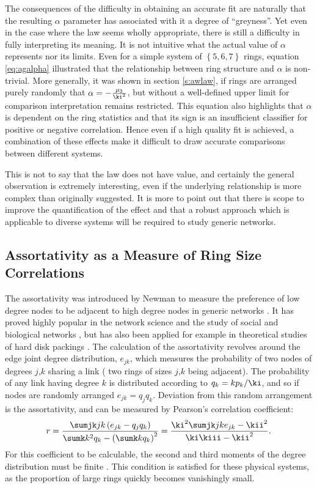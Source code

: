 The consequences of the difficulty in obtaining an accurate \aw{} fit are naturally that the resulting $\alpha$ parameter has associated with it a degree of ``greyness''.
Yet even in the case where the \aw{} law seems wholly appropriate, there is still a difficulty in fully interpreting its meaning.
It is not intuitive what the actual value of $\alpha$ represents nor its limits.
Even for a simple system of $\left\{5,6,7\right\}$ rings, equation \eqref{eq:agalpha} illustrated that the relationship between ring structure and $\alpha$ is non\--trivial.
More generally, it was shown in section \ref{s:awlaw}, if rings are arranged purely randomly that $\alpha=-\frac{\mu_2}{\ki^2}$, but without a well\--defined upper limit for comparison interpretation remains restricted.
This equation also highlights that $\alpha$ is dependent on the ring statistics and that its sign is an insufficient classifier for positive or negative correlation.
Hence even if a high quality fit is achieved, a combination of these effects make it difficult to draw accurate comparisons between different systems.

This is not to say that the \aw{} law does not have value, and certainly the general observation is extremely interesting, even if the underlying relationship is more complex than originally suggested.
It is more to point out that there is scope to improve the quantification of the effect and that a robust approach which is applicable to diverse systems will be required to study generic \td{} networks.

\subsection{Assortativity as a Measure of Ring Size Correlations}

The assortativity was introduced by Newman to measure the preference of low degree nodes to be adjacent to high degree nodes in generic networks \cite{Newman2002}.
It has proved highly popular in the network science and the study of social and biological networks \cite{Noldus2015}, but has also been applied for example in theoretical studies of hard disk packings \cite{Chremos2007}.
The calculation of the assortativity revolves around the edge joint degree distribution, $e_{jk}$, which measures the probability of two nodes of degrees $j$,$k$ sharing a link (\ie{} two rings of sizes $j$,$k$ being adjacent).
The probability of any link having degree $k$ is distributed according to $q_k=kp_k/\ki$, and so if nodes are randomly arranged $e_{jk}=q_j q_k$.
Deviation from this random arrangement is the assortativity, and can be measured by Pearson's correlation coefficient:
\begin{equation}
        \label{eq:assortativity}
        r = \frac{\sumjk jk\left(e_{jk}-q_jq_k\right)}{\sumk k^2q_k - \left(\sumk kq_k\right)^2}=\frac{\ki^2\sumjk jke_{jk}-\kii^2}{\ki\kiii-\kii^2}.
\end{equation}
For this coefficient to be calculable, the second and third moments of the degree distribution must be finite \cite{Litvak2013}.
This condition is satisfied for these physical systems, as the proportion of large rings quickly becomes vanishingly small.

